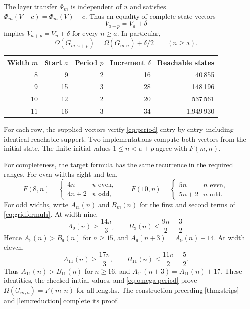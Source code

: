 \documentclass[11pt]{article}
\theoremstyle{definition}
\theoremstyle{remark}
\newcommand{\Om}{\Omega}
\begin{document}
The layer transfer $\Phi_m$ is independent of $n$ and satisfies
$\Phi_m(V+c)=\Phi_m(V)+c$. Thus an equality of complete state vectors
\begin{equation}\label{eq:period}
 V_{a+p}=V_a+\delta
\end{equation}
implies $V_{n+p}=V_n+\delta$ for every $n\ge a$. In particular,
\begin{equation}\label{eq:omega-period}
 \Om(G_{m,n+p})=\Om(G_{m,n})+\delta/2\qquad(n\ge a).
\end{equation}

\begin{center}
\begin{tabular}{rrrrr}
\toprule
Width $m$ & Start $a$ & Period $p$ & Increment $\delta$ & Reachable states\\
\midrule
8 & 9 & 2 & 16 & 40,855\\
9 & 15 & 3 & 28 & 148,196\\
10 & 12 & 2 & 20 & 537,561\\
11 & 16 & 3 & 34 & 1,949,930\\
\bottomrule
\end{tabular}
\end{center}

For each row, the supplied vectors verify \eqref{eq:period} entry by
entry, including identical reachable support. Two implementations compute
both vectors from the initial state. The finite initial values
$1\le n<a+p$ agree with $F(m,n)$.

For completeness, the target formula has the same recurrence in the
required ranges. For even widths eight and ten,
\[
 F(8,n)=\begin{cases}4n&n\text{ even},\\4n+2&n\text{ odd},\end{cases}
 \qquad
 F(10,n)=\begin{cases}5n&n\text{ even},\\5n+2&n\text{ odd}.\end{cases}
\]
For odd widths, write $A_m(n)$ and $B_m(n)$ for the first and second terms
of \eqref{eq:gridformula}. At width nine,
\[
 A_9(n)\ge\frac{14n}{3},\qquad
 B_9(n)\le\frac{9n}{2}+\frac32.
\]
Hence $A_9(n)>B_9(n)$ for $n\ge15$, and $A_9(n+3)=A_9(n)+14$.
At width eleven,
\[
 A_{11}(n)\ge\frac{17n}{3},\qquad
 B_{11}(n)\le\frac{11n}{2}+\frac52.
\]
Thus $A_{11}(n)>B_{11}(n)$ for $n\ge16$, and
$A_{11}(n+3)=A_{11}(n)+17$. These identities, the checked initial values,
and \eqref{eq:omega-period} prove $\Om(G_{m,n})=F(m,n)$ for all lengths.
The construction preceding \cref{thm:strips} and \cref{lem:reduction}
complete its proof.
\end{document}
